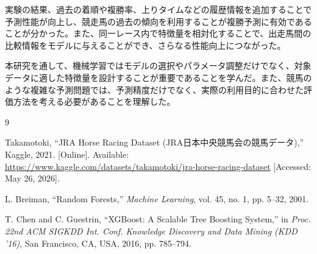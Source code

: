 \documentclass[dvipdfmx, a4paper, 11pt, titlepage]{jsarticle}
\begin{document}
実験の結果、過去の着順や複勝率、上りタイムなどの履歴情報を追加することで予測性能が向上し、競走馬の過去の傾向を利用することが複勝予測に有効であることが分かった。また、同一レース内で特徴量を相対化することで、出走馬間の比較情報をモデルに与えることができ、さらなる性能向上につながった。

本研究を通して、機械学習ではモデルの選択やパラメータ調整だけでなく、対象データに適した特徴量を設計することが重要であることを学んだ。また、競馬のような複雑な予測問題では、予測精度だけでなく、実際の利用目的に合わせた評価方法を考える必要があることを理解した。

\begin{thebibliography}{9}

Takamotoki, ``JRA Horse Racing Dataset (JRA日本中央競馬会の競馬データ),'' Kaggle, 2021. [Online]. Available: \url{https://www.kaggle.com/datasets/takamotoki/jra-horse-racing-dataset} [Accessed: May 26, 2026].

L. Breiman, ``Random Forests,'' \textit{Machine Learning}, vol. 45, no. 1, pp. 5--32, 2001.

T. Chen and C. Guestrin, ``XGBoost: A Scalable Tree Boosting System,'' in \textit{Proc. 22nd ACM SIGKDD Int. Conf. Knowledge Discovery and Data Mining (KDD '16)}, San Francisco, CA, USA, 2016, pp. 785--794.

\end{thebibliography}
\end{document}

